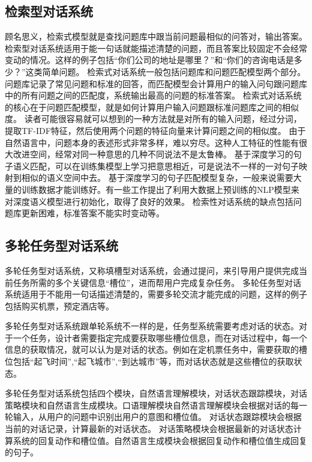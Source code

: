 \documentclass[graybox,envcountchap,sectrefs]{svmono}
\begin{document}
\subsection{检索型对话系统}
顾名思义，检索式模型就是查找问题库中跟当前问题最相似的问答对，输出答案。
检索型对话系统适用于能一句话就能描述清楚的问题，而且答案比较固定不会经常变动的情况。这样的例子包括``你们公司的地址是哪里？''和``你们的咨询电话是多少？''这类简单问题。
检索式对话系统一般包括问题库和问题匹配模型两个部分。问题库记录了常见问题和标准的回答，而匹配模型会计算用户的输入问句跟问题库中的所有问题之间的匹配度，系统输出最高的问题的标准答案。
检索式对话系统的核心在于问题匹配模型，就是如何计算用户输入问题跟标准问题库之间的相似度。
读者可能很容易就可以想到的一种方法就是对所有的输入问题，经过分词，提取TF-IDF特征，然后使用两个问题的特征向量来计算问题之间的相似度。
由于自然语言中，问题本身的表述形式非常多样，难以穷尽。这种人工特征的性能有很大改进空间，经常对同一种意思的几种不同说法不是太鲁棒。
基于深度学习的句子语义匹配，可以在训练集模型上学习把意思相近，可是说法不一样的一对句子映射到相似的语义空间中去。
基于深度学习的句子匹配模型复杂，一般来说需要大量的训练数据才能训练好。有一些工作提出了利用大数据上预训练的NLP模型来对深度语义模型进行初始化，取得了良好的效果。
检索性对话系统的缺点包括问题库更新困难，标准答案不能实时变动等。

\subsection{多轮任务型对话系统}
多轮任务型对话系统\cite{young2013pomdp}，又称填槽型对话系统，会通过提问，来引导用户提供完成当前任务所需的多个关键信息``槽位''，进而帮用户完成复杂任务。
多轮任务型对话系统适用于不能用一句话描述清楚的，需要多轮交流才能完成的问题，这样的例子包括购买机票，预定酒店等。

多轮任务型对话系统跟单轮系统不一样的是，任务型系统需要考虑对话的状态。对于一个任务，设计者需要指定完成要获取哪些槽位信息，而在对话过程中，每一个信息的获取情况，就可以认为是对话的状态。例如在定机票任务中，需要获取的槽位包括``起飞时间'',``起飞城市'',``到达城市''等，而对话状态就是这些槽位的获取状态。

多轮任务型对话系统包括四个模块，自然语言理解模块，对话状态跟踪模块，对话策略模块和自然语言生成模块。口语理解模块自然语言理解模块会根据对话的每一轮输入，从用户的问题中识别出用户的意图和槽位值。
对话状态跟踪模块会根据当前的对话记录，计算最新的对话状态。 对话策略模块会根据最新的对话状态计算系统的回复动作和槽位值。自然语言生成模块会根据回复动作和槽位值生成回复的句子。
\end{document}
